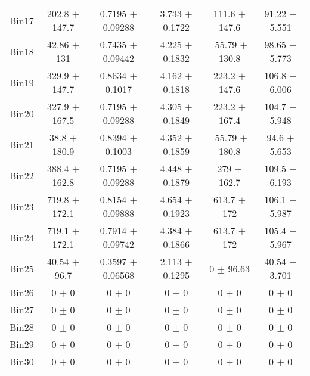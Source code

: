 \begin{tabular}{@{\extracolsep{4pt}}lccccc@{}}
     Bin17 & 202.8 $\pm$ 147.7 & 0.7195 $\pm$ 0.09288 & 3.733 $\pm$ 0.1722 & 111.6 $\pm$ 147.6 & 91.22 $\pm$ 5.551 \\ 
     Bin18 & 42.86 $\pm$ 131 & 0.7435 $\pm$ 0.09442 & 4.225 $\pm$ 0.1832 & -55.79 $\pm$ 130.8 & 98.65 $\pm$ 5.773 \\ 
     Bin19 & 329.9 $\pm$ 147.7 & 0.8634 $\pm$ 0.1017 & 4.162 $\pm$ 0.1818 & 223.2 $\pm$ 147.6 & 106.8 $\pm$ 6.006 \\ 
     Bin20 & 327.9 $\pm$ 167.5 & 0.7195 $\pm$ 0.09288 & 4.305 $\pm$ 0.1849 & 223.2 $\pm$ 167.4 & 104.7 $\pm$ 5.948 \\ 
     Bin21 & 38.8 $\pm$ 180.9 & 0.8394 $\pm$ 0.1003 & 4.352 $\pm$ 0.1859 & -55.79 $\pm$ 180.8 & 94.6 $\pm$ 5.653 \\ 
     Bin22 & 388.4 $\pm$ 162.8 & 0.7195 $\pm$ 0.09288 & 4.448 $\pm$ 0.1879 & 279 $\pm$ 162.7 & 109.5 $\pm$ 6.193 \\ 
     Bin23 & 719.8 $\pm$ 172.1 & 0.8154 $\pm$ 0.09888 & 4.654 $\pm$ 0.1923 & 613.7 $\pm$ 172 & 106.1 $\pm$ 5.987 \\ 
     Bin24 & 719.1 $\pm$ 172.1 & 0.7914 $\pm$ 0.09742 & 4.384 $\pm$ 0.1866 & 613.7 $\pm$ 172 & 105.4 $\pm$ 5.967 \\ 
     Bin25 & 40.54 $\pm$ 96.7 & 0.3597 $\pm$ 0.06568 & 2.113 $\pm$ 0.1295 & 0 $\pm$ 96.63 & 40.54 $\pm$ 3.701 \\ 
     Bin26 & 0 $\pm$ 0 & 0 $\pm$ 0 & 0 $\pm$ 0 & 0 $\pm$ 0 & 0 $\pm$ 0 \\ 
     Bin27 & 0 $\pm$ 0 & 0 $\pm$ 0 & 0 $\pm$ 0 & 0 $\pm$ 0 & 0 $\pm$ 0 \\ 
     Bin28 & 0 $\pm$ 0 & 0 $\pm$ 0 & 0 $\pm$ 0 & 0 $\pm$ 0 & 0 $\pm$ 0 \\ 
     Bin29 & 0 $\pm$ 0 & 0 $\pm$ 0 & 0 $\pm$ 0 & 0 $\pm$ 0 & 0 $\pm$ 0 \\ 
     Bin30 & 0 $\pm$ 0 & 0 $\pm$ 0 & 0 $\pm$ 0 & 0 $\pm$ 0 & 0 $\pm$ 0 \\ 
\hline\hline
  \end{tabular}
